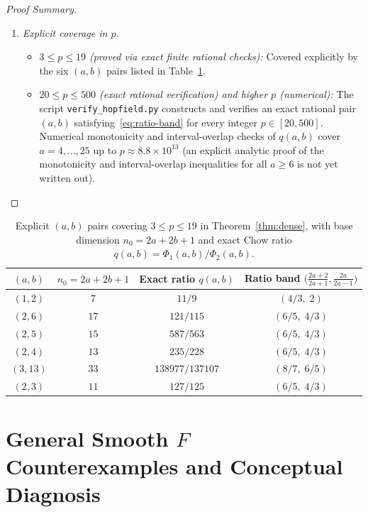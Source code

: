 \documentclass[11pt]{article}
\theoremstyle{definition}
\theoremstyle{remark}
\begin{document}
\begin{proof}[Proof Summary]
\begin{enumerate}[leftmargin=2em,itemsep=4pt]
  \item \emph{Explicit coverage in $p$.}
  \begin{itemize}[leftmargin=1.5em,itemsep=2pt]
    \item \emph{$3 \le p \le 19$ (proved via exact finite rational checks):} Covered explicitly by the six $(a,b)$ pairs listed in Table~\ref{tab:dense-pairs}.
    \item \emph{$20 \le p \le 500$ (exact rational verification) and higher $p$ (numerical):} The script \texttt{verify\_\allowbreak hopfield.py} constructs and verifies an exact rational pair $(a, b)$ satisfying~\eqref{eq:ratio-band} for every integer $p \in [20, 500]$. Numerical monotonicity and interval-overlap checks of $q(a, b)$ cover $a = 4,\dots,25$ up to $p \approx 8.8 \times 10^{13}$ (an explicit analytic proof of the monotonicity and interval-overlap inequalities for all $a \ge 6$ is not yet written out).
  \end{itemize}
\end{enumerate}
\end{proof}

\begin{table}[ht]
\centering
\caption{Explicit $(a, b)$ pairs covering $3 \le p \le 19$ in Theorem~\ref{thm:dense}, with base dimension $n_0 = 2a + 2b + 1$ and exact Chow ratio $q(a,b) = \Phi_1(a,b)/\Phi_2(a,b)$.}
\label{tab:dense-pairs}
\begin{tabular}{@{}cccc@{}}
\toprule
$(a, b)$ & $n_0 = 2a+2b+1$ & Exact ratio $q(a,b)$ & Ratio band $\bigl(\frac{2a+2}{2a+1}, \frac{2a}{2a-1}\bigr)$ \\
\midrule
$(1, 2)$ & $7$  & $11/9$            & $(4/3,\; 2)$ \\
$(2, 6)$ & $17$ & $121/115$         & $(6/5,\; 4/3)$ \\
$(2, 5)$ & $15$ & $587/563$         & $(6/5,\; 4/3)$ \\
$(2, 4)$ & $13$ & $235/228$         & $(6/5,\; 4/3)$ \\
$(3, 13)$ & $33$ & $138977/137107$  & $(8/7,\; 6/5)$ \\
$(2, 3)$ & $11$ & $127/125$         & $(6/5,\; 4/3)$ \\
\bottomrule
\end{tabular}
\end{table}

\section{General Smooth \texorpdfstring{$F$}{F} Counterexamples and Conceptual Diagnosis}
\end{document}
